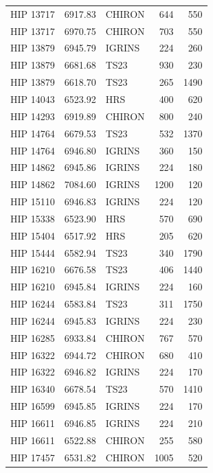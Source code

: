 {\begin{scriptsize}
\begin{longtable}{|l|rlrr|}
   HIP 13717 &  6917.83 &     CHIRON &      644 &   550 \\
   HIP 13717 &  6970.75 &     CHIRON &      703 &   550 \\
   HIP 13879 &  6945.79 &     IGRINS &      224 &   260 \\
   HIP 13879 &  6681.68 &       TS23 &      930 &   230 \\
   HIP 13879 &  6618.70 &       TS23 &      265 &  1490 \\
   HIP 14043 &  6523.92 &        HRS &      400 &   620 \\
   HIP 14293 &  6919.89 &     CHIRON &      800 &   240 \\
   HIP 14764 &  6679.53 &       TS23 &      532 &  1370 \\
   HIP 14764 &  6946.80 &     IGRINS &      360 &   150 \\
   HIP 14862 &  6945.86 &     IGRINS &      224 &   180 \\
   HIP 14862 &  7084.60 &     IGRINS &     1200 &   120 \\
   HIP 15110 &  6946.83 &     IGRINS &      224 &   120 \\
   HIP 15338 &  6523.90 &        HRS &      570 &   690 \\
   HIP 15404 &  6517.92 &        HRS &      205 &   620 \\
   HIP 15444 &  6582.94 &       TS23 &      340 &  1790 \\
   HIP 16210 &  6676.58 &       TS23 &      406 &  1440 \\
   HIP 16210 &  6945.84 &     IGRINS &      224 &   160 \\
   HIP 16244 &  6583.84 &       TS23 &      311 &  1750 \\
   HIP 16244 &  6945.83 &     IGRINS &      224 &   230 \\
   HIP 16285 &  6933.84 &     CHIRON &      767 &   570 \\
   HIP 16322 &  6944.72 &     CHIRON &      680 &   410 \\
   HIP 16322 &  6946.82 &     IGRINS &      224 &   170 \\
   HIP 16340 &  6678.54 &       TS23 &      570 &  1410 \\
   HIP 16599 &  6945.85 &     IGRINS &      224 &   170 \\
   HIP 16611 &  6946.85 &     IGRINS &      224 &   210 \\
   HIP 16611 &  6522.88 &     CHIRON &      255 &   580 \\
   HIP 17457 &  6531.82 &     CHIRON &     1005 &   520 \\

\end{longtable}
\end{scriptsize}}
